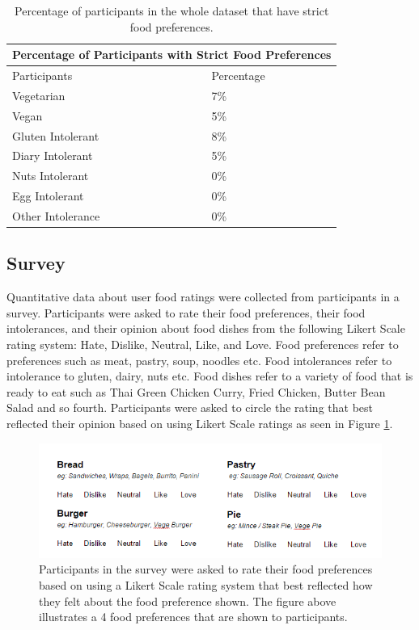 \begin{table}[h!]
\centering
\begin{tabular}{|l|l|} 
 \hline
 \multicolumn{2}{|c|}{Percentage of Participants with Strict Food Preferences} \\
    \hline
    \hline
    Participants & Percentage \\
     \hline\hline
     Vegetarian & 7\%\\ [0.5ex] 
     \hline
     Vegan & 5\% \\
     \hline
     Gluten Intolerant & 8\% \\
    \hline
     Diary Intolerant & 5\% \\
     \hline
     Nuts Intolerant & 0\% \\
     \hline
     Egg Intolerant & 0\% \\
     \hline
     Other Intolerance & 0\% \\
     \hline
\end{tabular}
\caption{Percentage of participants in the whole dataset that have strict food preferences.}
\label{table:food_participants}
\end{table}

\subsection{Survey}

Quantitative data about user food ratings were collected from participants in a survey. Participants were asked to rate their food preferences, their food intolerances, and their opinion about food dishes from the following Likert Scale rating system: Hate, Dislike, Neutral, Like, and Love. Food preferences refer to preferences such as meat, pastry, soup, noodles etc. Food intolerances refer to intolerance to gluten, dairy, nuts etc. Food dishes refer to a variety of food that is ready to eat such as Thai Green Chicken Curry, Fried Chicken, Butter Bean Salad and so fourth. Participants were asked to circle the rating that best reflected their opinion based on using Likert Scale ratings as seen in Figure \ref{fig:survey}.

\begin{figure}
\centering
\includegraphics[scale=0.8]{images/survey_preferences.png}
\caption{Participants in the survey were asked to rate their food preferences based on using a Likert Scale rating system that best reflected how they felt about the food preference shown. The figure above illustrates a 4 food preferences that are shown to participants.}
\label{fig:survey}
\end{figure}

